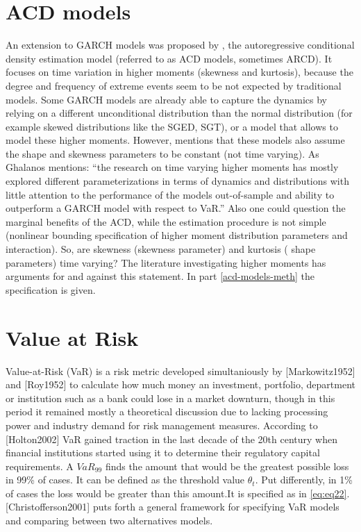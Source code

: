 \documentclass[a4paper, twoside]{templates/ociamthesis}
\begin{document}
\hypertarget{acd-models}{%
\section{ACD models}\label{acd-models}}

An extension to GARCH models was proposed by \textcite{hansen1994}, the autoregressive conditional density estimation model (referred to as ACD models, sometimes ARCD). It focuses on time variation in higher moments (skewness and kurtosis), because the degree and frequency of extreme events seem to be not expected by traditional models. Some GARCH models are already able to capture the dynamics by relying on a different unconditional distribution than the normal distribution (for example skewed distributions like the SGED, SGT), or a model that allows to model these higher moments. However, \textcite{ghalanos2016} mentions that these models also assume the shape and skewness parameters to be constant (not time varying). As Ghalanos mentions: ``the research on time varying higher moments has mostly explored different parameterizations in terms of dynamics and distributions with little attention to the performance of the models out-of-sample and ability to outperform a GARCH model with respect to VaR.'' Also one could question the marginal benefits of the ACD, while the estimation procedure is not simple (nonlinear bounding specification of higher moment distribution parameters and interaction). So, are skewness (skewness parameter) and kurtosis ( shape parameters) time varying? The literature investigating higher moments has arguments for and against this statement. In part \ref{acd-models-meth} the specification is given.

\newpage

\hypertarget{value-at-risk}{%
\section{Value at Risk}\label{value-at-risk}}

Value-at-Risk (VaR) is a risk metric developed simultaniously by {[}Markowitz1952{]} and {[}Roy1952{]} to calculate how much money an investment, portfolio, department or institution such as a bank could lose in a market downturn, though in this period it remained mostly a theoretical discussion due to lacking processing power and industry demand for risk management measures. According to {[}Holton2002{]} VaR gained traction in the last decade of the 20th century when financial institutions started using it to determine their regulatory capital requirements. A \(VaR_{99}\) finds the amount that would be the greatest possible loss in 99\% of cases. It can be defined as the threshold value \(\theta_t\). Put differently, in 1\% of cases the loss would be greater than this amount.It is specified as in \eqref{eq:eq22}. {[}Christofferson2001{]} puts forth a general framework for specifying VaR models and comparing between two alternatives models.
\end{document}
